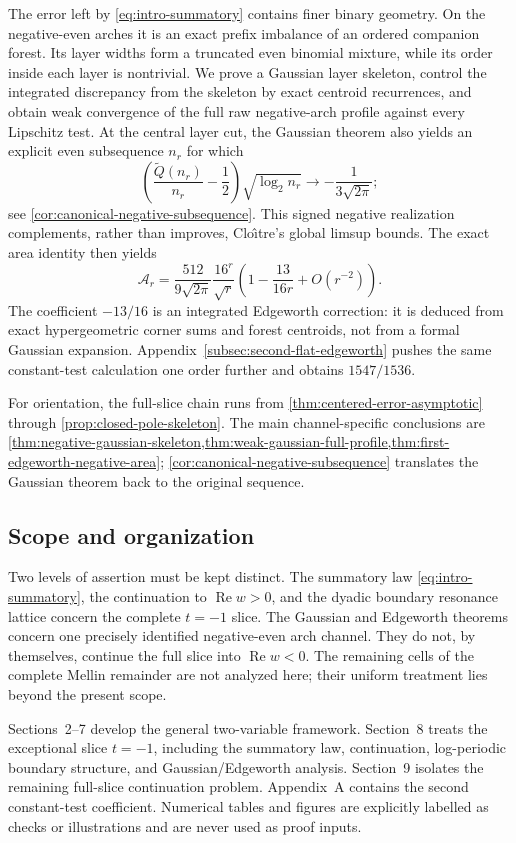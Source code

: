 \documentclass[11pt]{article}
\theoremstyle{definition}
\theoremstyle{remark}
\newcommand{\Qp}{\widetilde Q}
\newcommand{\RePart}{\operatorname{Re}}
\begin{document}
The error left by \eqref{eq:intro-summatory} contains finer binary
geometry.  On the negative-even arches it is an exact prefix imbalance of
an ordered companion forest.  Its layer widths form a truncated even
binomial mixture, while its order inside each layer is nontrivial.  We
prove a Gaussian layer skeleton, control the integrated discrepancy from
the skeleton by exact centroid recurrences, and obtain weak convergence of
the full raw negative-arch profile against every Lipschitz test.  At the central layer
cut, the Gaussian theorem also yields an explicit even subsequence \(n_r\)
for which
\[
 \left(\frac{\Qp(n_r)}{n_r}-\frac12\right)\sqrt{\log_2n_r}
 \longrightarrow-\frac{1}{3\sqrt{2\pi}};
\]
see \cref{cor:canonical-negative-subsequence}.  This signed negative
realization complements, rather than improves, Clo\^{\i}tre's global
limsup bounds.  The exact area identity then yields
\[
 \mathcal A_r=\frac{512}{9\sqrt{2\pi}}\frac{16^r}{\sqrt r}
 \left(1-\frac{13}{16r}+O(r^{-2})\right).
\]
The coefficient $-13/16$ is an integrated Edgeworth correction: it is
deduced from exact hypergeometric corner sums and forest centroids, not
from a formal Gaussian expansion.  Appendix~\ref{subsec:second-flat-edgeworth}
pushes the same constant-test calculation one order further and obtains
$1547/1536$.

For orientation, the full-slice chain runs from
\cref{thm:centered-error-asymptotic} through
\cref{prop:closed-pole-skeleton}.  The main channel-specific conclusions are
\cref{thm:negative-gaussian-skeleton,thm:weak-gaussian-full-profile,thm:first-edgeworth-negative-area};
\cref{cor:canonical-negative-subsequence} translates the Gaussian theorem
back to the original sequence.

\subsection{Scope and organization}

Two levels of assertion must be kept distinct.  The summatory law
\eqref{eq:intro-summatory}, the continuation to $\RePart w>0$, and the
dyadic boundary resonance lattice concern the complete $t=-1$ slice.  The
Gaussian and Edgeworth theorems concern one precisely identified
negative-even arch channel.  They do not, by themselves, continue the full
slice into $\RePart w<0$.  The remaining cells of the complete Mellin
remainder are not analyzed here; their uniform treatment lies beyond the
present scope.

Sections~2--7 develop the general two-variable framework.  Section~8 treats
the exceptional slice $t=-1$, including the summatory law, continuation,
log-periodic boundary structure, and Gaussian/Edgeworth analysis.
Section~9 isolates the remaining full-slice continuation problem.
Appendix~A contains the second constant-test coefficient.  Numerical tables
and figures are explicitly labelled as checks or illustrations and are never
used as proof inputs.
\end{document}
